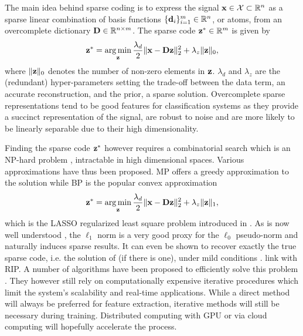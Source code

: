 The main idea behind sparse coding \cite{olshausen1996SparseV1, mairal2008sparseCoding} is to express the signal $\mathbf{x} \in \mathcal{X} \subset \mathbb{R}^n$ as a sparse linear combination of basis functions $\{\mathbf{d}_i\}_{i=1}^m \in \mathbb{R}^n$, or atoms, from an overcomplete dictionary $\mathbf{D} \in \mathbb{R}^{n \times m}$. The sparse code $\mathbf{z}^* \in \mathbb{R}^m$ is given by
\begin{equation} \label{eqn:sparsecoding}
	\mathbf{z}^* = \operatorname*{arg\,min}\limits_{\mathbf{z}} \frac{\lambda_d}{2} \| \mathbf{x} - \mathbf{D} \mathbf{z} \|_2^2 + \lambda_z \| \mathbf{z} \|_0,
\end{equation}
where $\| \mathbf{z} \|_0$ denotes the number of non-zero elements in $\mathbf{z}$.  $\lambda_d$ and $\lambda_z$ are the (redundant) hyper-parameters setting the trade-off between the data term, an accurate reconstruction, and the prior, a sparse solution. Overcomplete sparse representations tend to be good features for classification systems as they provide a succinct representation of the signal, are robust to noise and are more likely to be linearly separable due to their high dimensionality.

Finding the sparse code $\mathbf{z}^*$ however requires a combinatorial search which is an NP-hard problem \cite{natarajan1995sparseNPhard}, intractable in high dimensional spaces. Various approximations have thus been proposed. \gls{MP} \cite{mallat1993MatchingPursuit} offers a greedy approximation to the solution while \gls{BP} \cite{chen1998BasisPursuit} is the popular convex approximation
\begin{equation} \label{eqn:basispursuit}
	\mathbf{z}^* = \operatorname*{arg\,min}\limits_{\mathbf{z}} \frac{\lambda_d}{2} \| \mathbf{x} - \mathbf{D} \mathbf{z} \|_2^2 + \lambda_z \| \mathbf{z} \|_1,
\end{equation}
which is the \gls{LASSO} regularized least square problem introduced in . As is now well understood \cite{candes2005CS, donoho2006CS}, the $\ell_1$ norm is a very good proxy for the $\ell_0$ pseudo-norm and naturally induces sparse results. It can even be shown to recover exactly the true sparse code, i.e. the solution of  (if there is one), under mild conditions \cite{donoho2003OptSparse}. {\color{red}link with \gls{RIP}}. A number of algorithms have been proposed to efficiently solve this problem \cite{chen1998BasisPursuit, beck2009FISTA, ng2006EfficientSparse, li2009Coordinate}. They however still rely on computationally expensive iterative procedures which limit the system's scalability and real-time applications. While a direct method will always be preferred for feature extraction, iterative methods will still be necessary during training. Distributed computing with \gls{GPU} or via cloud computing will hopefully accelerate the process.

